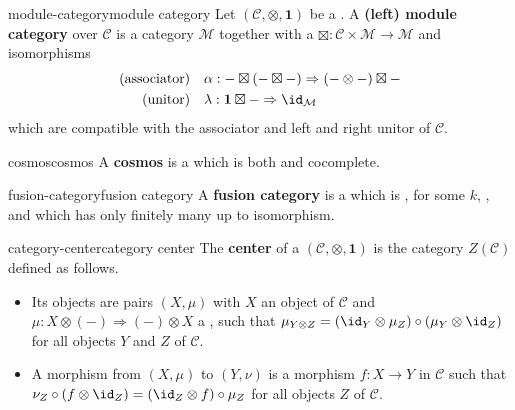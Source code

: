 \begin{topic}{module-category}{module category}
    Let $(\mathcal{C}, \otimes, \textbf{1})$ be a . A \textbf{(left) module category} over $\mathcal{C}$ is a category $\mathcal{M}$ together with a  $\boxtimes : \mathcal{C} \times \mathcal{M} \to \mathcal{M}$ and  isomorphisms
    \[ \begin{aligned}
        \textup{(associator)}& \quad \alpha : - \boxtimes (- \boxtimes -) \Rightarrow (- \otimes -) \boxtimes - \\
        \textup{(unitor)}& \quad \lambda : \textbf{1} \boxtimes - \Rightarrow \id_\mathcal{M}
    \end{aligned} \]
    which are compatible with the associator and left and right unitor of $\mathcal{C}$.
\end{topic}

\begin{topic}{cosmos}{cosmos}
    A \textbf{cosmos} is a    which is both  and cocomplete.
\end{topic}

\begin{topic}{fusion-category}{fusion category}
    A \textbf{fusion category} is a  which is ,  for some  $k$, , and which has only finitely many  up to isomorphism.
\end{topic}

\begin{topic}{category-center}{category center}
    The \textbf{center} of a  $(\mathcal{C}, \otimes, \textbf{1})$ is the category $Z(\mathcal{C})$ defined as follows.
    \begin{itemize}
        \item Its objects are pairs $(X, \mu)$ with $X$ an object of $\mathcal{C}$ and $\mu : X \otimes (-) \Rightarrow (-) \otimes X$ a , such that $\mu_{Y \otimes Z} = (\id_Y \otimes \mu_Z) \circ (\mu_Y \otimes \id_Z)$ for all objects $Y$ and $Z$ of $\mathcal{C}$.
        \item A morphism from $(X, \mu)$ to $(Y, \nu)$ is a morphism $f : X \to Y$ in $\mathcal{C}$ such that $\nu_Z \circ (f \otimes \id_Z) = (\id_Z \otimes f) \circ \mu_Z$ for all objects $Z$ of $\mathcal{C}$.
    \end{itemize}
\end{topic}
